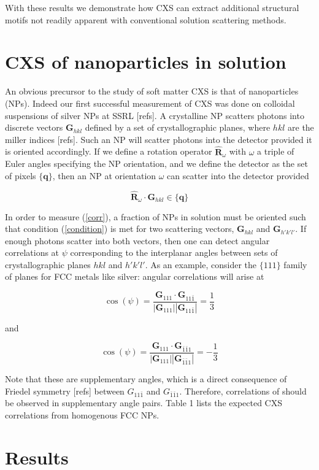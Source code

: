 \documentclass [11pt,fleqn]{article}
\def \be {\begin{equation}}
\def \ee {\end{equation}}
\begin{document}
With these results we demonstrate how CXS can extract additional structural motifs not readily apparent with conventional solution scattering methods.
 
\section{CXS of nanoparticles in solution}

An obvious precursor to the study of soft matter  CXS is that of nanoparticles (NPs). Indeed our first successful measurement of CXS was done on colloidal suspensions of silver NPs at SSRL [refs]. A crystalline NP scatters photons into discrete vectors $\bm G_{hkl}$ defined by a set of crystallographic planes, where $hkl$ are the miller indices [refs]. Such an NP will scatter photons into the detector provided it is oriented accordingly. If we define a rotation operator $\hat{\bm R}_\omega$ with $\omega$ a triple of Euler angles specifying the NP orientation, and we define the detector as the set of pixels $\{\bm q\}$, then an NP at orientation $\omega$ can scatter into the detector provided 

\be \label{condition}
\hat{\bm R}_\omega \cdot \bm G_{hkl} \in \{\bm q\}
\ee

In order to measure (\ref{corr}), a fraction of NPs in solution must be oriented such that condition (\ref{condition}) is met for two scattering vectors, $\bm G_{hkl}$ and $\bm G_{h'k'l'}$. If enough photons scatter into both vectors, then one can detect angular correlations at $\psi$ corresponding to the interplanar angles between sets of crystallographic planes $hkl$ and $h'k'l'$. As an example, consider the $\{111\}$ family of planes for FCC metals like silver: angular correlations will arise at

\be
\cos (\psi) = \frac{\bm G_{111} \cdot \bm G_{11\bar{1}}}{|\bm G_{111}| |\bm G_{11\bar{1}}| } = \frac{1}{3}
\ee

and

\be
\cos (\psi) = \frac{\bm G_{111} \cdot \bm G_{\bar{1}\bar{1}1}}{|\bm G_{111}| |\bm G_{\bar{1}\bar{1}1}| } = -\frac{1}{3}
\ee

Note that these are supplementary angles, which is a direct consequence of Friedel symmetry [refs] between $G_{11\bar{1}}$ and $G_{\bar{1}\bar{1}1}$. Therefore, correlations of should be observed in supplementary angle pairs.  Table 1 lists the expected CXS correlations from homogenous FCC NPs.

\section{Results}
\end{document}
